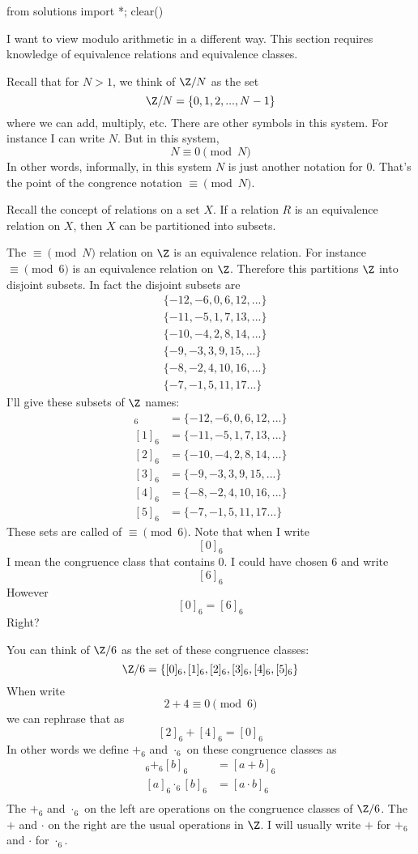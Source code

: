 \begin{python0}
from solutions import *; clear()
\end{python0}

I want to view modulo arithmetic in a different way.
This section requires knowledge of equivalence relations and
equivalence classes.

Recall that for $N > 1$, we think of $\Z/N$ as the set
\[
\Z/N = \{0, 1, 2, ..., N - 1\}
\]
where we can add, multiply, etc.
There are other symbols in this system.
For instance I can write $N$.
But in this system,
\[
N \equiv 0 \pmod{N}
\]
In other words, informally, in this system $N$ is just another notation
for $0$.
That's the point of the congrence notation $\equiv \pmod{N}$.

Recall the concept of relations on a set $X$.
If a relation $R$ is an equivalence relation on $X$,
then $X$ can be partitioned into subsets.

The $\equiv \pmod N$ relation on $\Z$ is an equivalence relation.
For instance $\equiv \pmod 6$ is an equivalence relation on $\Z$.
Therefore this partitions $\Z$ into disjoint subsets.
In fact the disjoint subsets are
\begin{align*}
&\{-12, -6, 0, 6, 12, ...\} \\
&\{-11, -5, 1, 7, 13, ...\} \\
&\{-10, -4, 2, 8, 14, ...\} \\
&\{-9, -3, 3, 9, 15, ...\} \\
&\{-8, -2, 4, 10, 16, ...\} \\
&\{-7, -1, 5, 11, 17 ...\} 
\end{align*}
I'll give these subsets of $\Z$ names:
\begin{align*}
[0]_6 &= \{-12, -6, 0, 6, 12, ...\} \\
[1]_6 &= \{-11, -5, 1, 7, 13, ...\} \\
[2]_6 &= \{-10, -4, 2, 8, 14, ...\} \\
[3]_6 &= \{-9, -3, 3, 9, 15, ...\} \\
[4]_6 &= \{-8, -2, 4, 10, 16, ...\} \\
[5]_6 &= \{-7, -1, 5, 11, 17 ...\} 
\end{align*}
These sets are called  of $\equiv \pmod{6}$.
Note that when I write
\[
[0]_6
\]
I mean the congruence class that contains $0$.
I could have chosen $6$ and write
\[
[6]_6
\]
However
\[
[0]_6 = [6]_6
\]
Right?

You can think of $\Z/6$ as the set of these congruence classes:
\[
\Z/6 = \{[0]_6, [1]_6, [2]_6, [3]_6, [4]_6, [5]_6\}
\]
When write
\[
2 + 4 \equiv 0 \pmod{6}
\]
we can rephrase that as 
\[
[2]_6 + [4]_6 = [0]_6
\]
In other words we define $+_6$ and $\cdot_6$ on these congruence classes
as
\begin{align*}
[a]_6 +_6 [b]_6 &= [a + b]_6 \\
[a]_6 \cdot_6 [b]_6 &= [a \cdot b]_6 \\
\end{align*}
The $+_6$ and $\cdot_6$ on the left are operations on the congruence classes
of $\Z/6$.
The $+$ and $\cdot$ on the right are the usual operations in $\Z$.
I will usually write $+$ for $+_6$
and $\cdot$ for $\cdot_6$.

